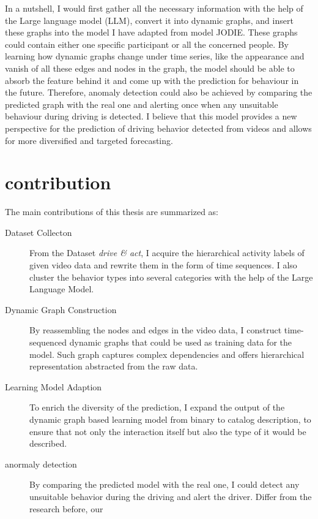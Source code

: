 In a nutshell, I would first gather all the necessary information with the help of the Large language model (LLM), convert it into dynamic graphs, and insert these graphs into the model I have adapted from model JODIE. These graphs could contain either one specific participant or all the concerned people. By learning how dynamic graphs change under time series, like the appearance and vanish of all these edges and nodes in the graph, the model should be able to absorb the feature behind it and come up with the prediction for behaviour in the future. Therefore, anomaly detection could also be achieved by comparing the predicted graph with the real one and alerting once when any unsuitable behaviour during driving is detected. I believe that this model provides a new perspective for the prediction of driving behavior detected from videos and allows for more diversified and targeted forecasting.


\section{contribution}
The main contributions of this thesis are summarized as:
\begin{description}
    \item[Dataset Collecton] From the Dataset \textit{drive \& act}, I acquire the hierarchical activity labels of given video data and rewrite them in the form of time sequences. I also cluster the behavior types into several categories with the help of the Large Language Model.
    \item[Dynamic Graph Construction] By reassembling the nodes and edges in the video data, I construct time-sequenced dynamic graphs that could be used as training data for the model. Such graph captures complex dependencies and offers hierarchical representation abstracted from the raw data.
    \item[Learning Model Adaption] To enrich the diversity of the prediction, I expand the output of the dynamic graph based learning model from binary to catalog description, to ensure that not only the interaction itself but also the type of it would be described.
    \item[anormaly detection] By comparing the predicted model with the real one, I could detect any unsuitable behavior during the driving and alert the driver. Differ from the research before, our 
\end{description}
    
    



